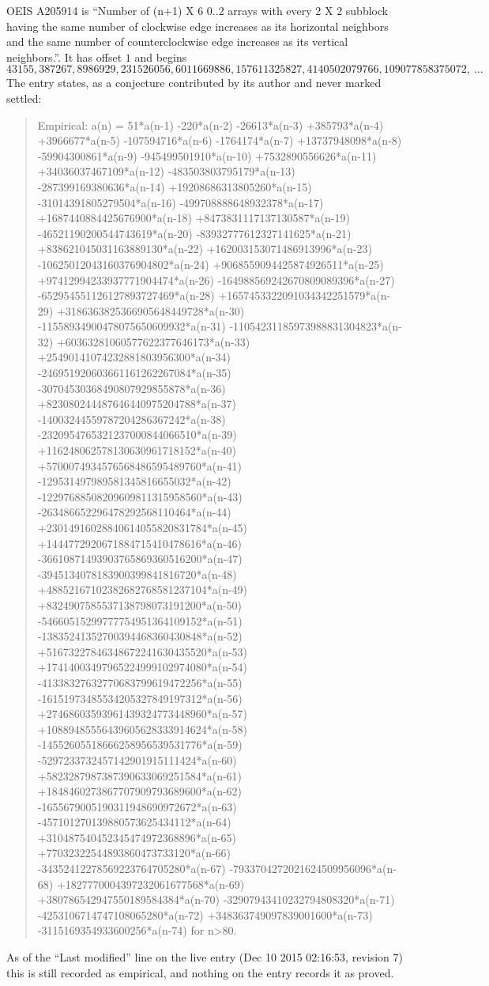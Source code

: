 \documentclass[11pt,a4paper]{article}
\theoremstyle{plain}
\theoremstyle{definition}
\begin{document}
OEIS A205914 is ``Number of (n+1) X 6 0..2 arrays with every 2 X 2 subblock having the same number of clockwise edge increases as its horizontal neighbors and the same number of counterclockwise edge increases as its vertical neighbors.''. It has offset $1$ and begins
\[
43155, 387267, 8986929, 231526056, 6011669886, 157611325827, 4140502079766, 109077858375072,\ \dots
\]
The entry states, as a conjecture contributed by its author and never marked settled:
\begin{quote}
Empirical: a(n) = 51*a(n-1) -220*a(n-2) -26613*a(n-3) +385793*a(n-4) +3966677*a(n-5) -107594716*a(n-6) -1764174*a(n-7) +13737948098*a(n-8) -59904300861*a(n-9) -945499501910*a(n-10) +7532890556626*a(n-11) +34036037467109*a(n-12) -483503803795179*a(n-13) -287399169380636*a(n-14) +19208686313805260*a(n-15) -31014391805279504*a(n-16) -499708888648932378*a(n-17) +1687440884425676900*a(n-18) +8473831117137130587*a(n-19) -46521190200544743619*a(n-20) -83932777612327141625*a(n-21) +838621045031163889130*a(n-22) +162003153071486913996*a(n-23) -10625012043160376904802*a(n-24) +9068559094425874926511*a(n-25) +97412994233937771904474*a(n-26) -164988569242670809089396*a(n-27) -652954551126127893727469*a(n-28) +1657453322091034342251579*a(n-29) +3186363825366905648449728*a(n-30) -11558934900478075650609932*a(n-31) -11054231185973988831304823*a(n-32) +60363281060577622377646173*a(n-33) +25490141074232881803956300*a(n-34) -246951920603661161262267084*a(n-35) -30704530368490807929855878*a(n-36) +823080244487646440975204788*a(n-37) -14003244559787204286367242*a(n-38) -2320954765321237000844066510*a(n-39) +116248062578130630961718152*a(n-40) +5700074934576568486595489760*a(n-41) -129531497989581345816655032*a(n-42) -12297688508209609811315958560*a(n-43) -263486652296478292568110464*a(n-44) +23014916028840614055820831784*a(n-45) +1444772920671884715410478616*a(n-46) -36610871493903765869360516200*a(n-47) -3945134078183900399841816720*a(n-48) +48852167102382682768581237104*a(n-49) +8324907585537138798073191200*a(n-50) -54660515299777754951364109152*a(n-51) -13835241352700394468360430848*a(n-52) +51673227846348672241630435520*a(n-53) +17414003497965224999102974080*a(n-54) -41338327632770683799619472256*a(n-55) -16151973485534205327849197312*a(n-56) +27468603593961439324773448960*a(n-57) +10889485556439605628333914624*a(n-58) -14552605518666258956539531776*a(n-59) -5297233732457142901915111424*a(n-60) +5823287987387390633069251584*a(n-61) +1848460273867707909793689600*a(n-62) -1655679005190311948690972672*a(n-63) -457101270139880573625434112*a(n-64) +310487540452345474972368896*a(n-65) +77032322544893860473733120*a(n-66) -34352412278569223764705280*a(n-67) -7933704272021624509956096*a(n-68) +1827770004397232061677568*a(n-69) +380786542947550189584384*a(n-70) -32907943410232794808320*a(n-71) -4253106714747108065280*a(n-72) +348363749097839001600*a(n-73) -3115169354933600256*a(n-74) for n>80.
\end{quote}
As of the ``Last modified'' line on the live entry (Dec 10 2015 02:16:53, revision 7) this is still
recorded as empirical, and nothing on the entry records it as proved.
\end{document}
